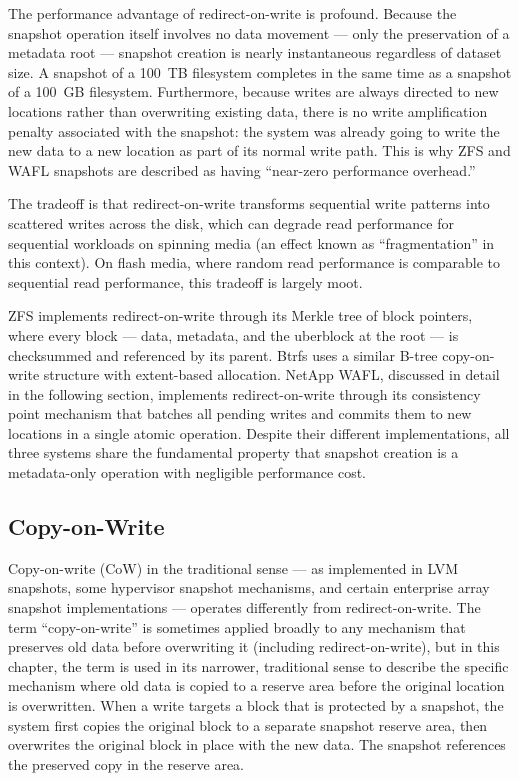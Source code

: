 The performance advantage of redirect-on-write is profound. Because the snapshot operation itself involves no data movement --- only the preservation of a metadata root --- snapshot creation is nearly instantaneous regardless of dataset size. A snapshot of a 100~TB filesystem completes in the same time as a snapshot of a 100~GB filesystem. Furthermore, because writes are always directed to new locations rather than overwriting existing data, there is no write amplification penalty associated with the snapshot: the system was already going to write the new data to a new location as part of its normal write path. This is why ZFS and WAFL snapshots are described as having ``near-zero performance overhead.''

The tradeoff is that redirect-on-write transforms sequential write patterns into scattered writes across the disk, which can degrade read performance for sequential workloads on spinning media (an effect known as ``fragmentation'' in this context). On flash media, where random read performance is comparable to sequential read performance, this tradeoff is largely moot.

ZFS implements redirect-on-write through its Merkle tree of block pointers, where every block --- data, metadata, and the uberblock at the root --- is checksummed and referenced by its parent. Btrfs uses a similar B-tree copy-on-write structure with extent-based allocation. NetApp WAFL, discussed in detail in the following section, implements redirect-on-write through its consistency point mechanism that batches all pending writes and commits them to new locations in a single atomic operation. Despite their different implementations, all three systems share the fundamental property that snapshot creation is a metadata-only operation with negligible performance cost.

\subsection{Copy-on-Write}

Copy-on-write (CoW) in the traditional sense --- as implemented in LVM snapshots, some hypervisor snapshot mechanisms, and certain enterprise array snapshot implementations --- operates differently from redirect-on-write. The term ``copy-on-write'' is sometimes applied broadly to any mechanism that preserves old data before overwriting it (including redirect-on-write), but in this chapter, the term is used in its narrower, traditional sense to describe the specific mechanism where old data is copied to a reserve area before the original location is overwritten. When a write targets a block that is protected by a snapshot, the system first copies the original block to a separate snapshot reserve area, then overwrites the original block in place with the new data. The snapshot references the preserved copy in the reserve area.

